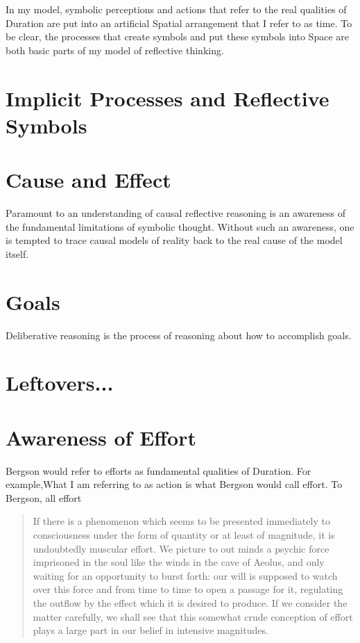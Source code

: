In my model, symbolic perceptions and actions that refer to the real
qualities of Duration are put into an artificial Spatial arrangement
that I refer to as time.  To be clear, the processes that create
symbols and put these symbols into Space are both basic parts of my
model of reflective thinking.

\section{Implicit Processes and Reflective Symbols}



\section{Cause and Effect}

Paramount to an understanding of causal reflective reasoning is an
awareness of the fundamental limitations of symbolic thought.  Without
such an awareness, one is tempted to trace causal models of reality
back to the real cause of the model itself.  

\section{Goals}

Deliberative reasoning is the process of reasoning about how to
accomplish goals.  



\section{Leftovers...}

\section{Awareness of Effort}

Bergson would refer to efforts as fundamental qualities of Duration.
For example,What I am referring to as action is what Bergson would
call effort.  To Bergson, all effort

\begin{quote}
If there is a phenomenon which seems to be presented immediately to
consciousness under the form of quantity or at least of magnitude, it
is undoubtedly muscular effort.  We picture to out minds a psychic
force imprisoned in the soul like the winds in the cave of Aeolus, and
only waiting for an opportunity to burst forth: our will is supposed
to watch over this force and from time to time to open a passage for
it, regulating the outflow by the effect which it is desired to
produce.  If we consider the matter carefully, we shall see that this
somewhat crude conception of effort plays a large part in our belief
in intensive magnitudes.
\end{quote}

